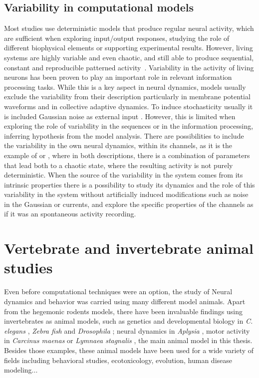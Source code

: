 \subsection{Variability in computational models}

 Most studies use deterministic models that produce regular neural activity, which are sufficient when exploring input/output responses, studying the role of different biophysical elements or supporting experimental results. However, living systems are highly variable and even chaotic, and still able to produce sequential, constant and reproducible patterned activity~\parencite{selverston_reliable_2000}. Variability in the activity of living neurons has been proven to play an important role in relevant information processing tasks. While this is a key aspect in neural dynamics, models usually exclude the variability from their description particularly in membrane potential waveforms and in collective adaptive dynamics. To induce stochasticity usually it is included Gaussian noise as external input \parencite{linaro_accurate_2011,pezo_diffusion_2014,zheng_spontaneous_2020}. However, this is limited when exploring the role of variability in the sequences or in the information processing, inferring hypothesis from the model analysis. There are possibilities to include the variability in the own neural dynamics, within its channels, as it is the example of \cite{hindmarsh_model_1984} or \cite{komendantov_deterministic_1996}, where in both descriptions, there is a combination of parameters that lead both to a chaotic state, where the resulting activity is not purely deterministic. When the source of the variability in the system comes from its intrinsic properties there is a possibility to study its dynamics and the role of this variability in the system without artificially induced modifications such as noise in the Gaussian or currents, and explore the specific properties of the channels as if it was an spontaneous activity recording.


\section{Vertebrate and invertebrate animal studies}
\label{c-intro-invertebrates}
Even before computational techniques were an option, the study of Neural dynamics and behavior was carried using many different model animals. Apart from the hegemonic rodents models, there have been invaluable findings using invertebrates as animal models, such as genetics and developmental biology in \textit{C. elegans} \parencite{brenner_genetics_1974}, \textit{Zebra fish} \parencite{streisinger_production_1981} and \textit{Drosophila} \parencite{nusslein-volhard_mutations_1980}; neural dynamics in \textit{Aplysia} \parencite{HODGKIN1952,wachtel_direct_1967}, motor activity in \textit{Carcinus maenas} \parencite{eisen_mechanisms_1982} or \textit{Lymnaea stagnalis} \parencite{Benjamin1979b}, the main animal model in this thesis. Besides those examples, these animal models have been used for a wide variety of fields including behavioral studies, ecotoxicology, evolution, human disease modeling... \parencite{romanova_animal_2018} 

